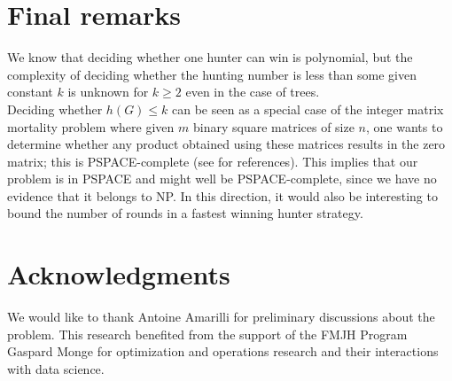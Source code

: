 \documentclass[runningheads]{llncs}
\newcommand{\ale}[1]{\textcolor{blue}{#1}}
\begin{document}
\section{Final remarks}
We know that deciding whether one hunter can win is polynomial, but the complexity of deciding whether the hunting number is less than some given constant $k$ is unknown for $k\ge 2$ even in the case of trees.\\ %
Deciding whether $h(G)\le k$ can be seen as a special case of the integer matrix mortality problem where given $m$ binary square matrices of size $n$, one wants to determine whether any product obtained using these matrices results in the zero matrix; this is PSPACE-complete (see \cite{benameur2024complexityresultscopsrobber} for references). {This implies that our problem is in PSPACE and might well be PSPACE-complete, since we have no evidence that it belongs to NP.} %
In this direction, it would also be interesting to bound the number of rounds in a fastest winning hunter strategy.
\\
\section*{Acknowledgments}
We would like  to thank Antoine Amarilli for preliminary discussions about the problem.
This research benefited from the support of the FMJH Program Gaspard Monge for optimization and operations research and their interactions with data science.



\end{document}
